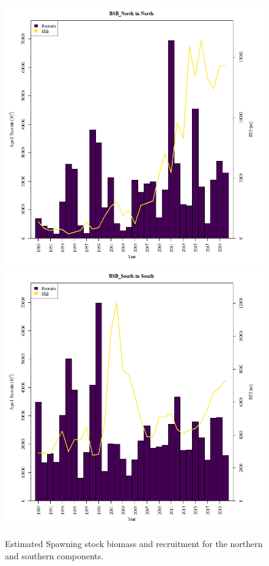\documentclass[
]{article}
\begin{document}
\begin{figure}

{\centering \includegraphics[width=0.65\linewidth]{../2023.RT.Runs/Run34/plots_png/results/SSB_Rec_time_BSB_North} \includegraphics[width=0.65\linewidth]{../2023.RT.Runs/Run34/plots_png/results/SSB_Rec_time_BSB_South} 

}

\caption{Estimated Spawning stock biomass and recruitment for the northern and southern components.}\label{fig:SSB-R-time}
\end{figure}
\end{document}
